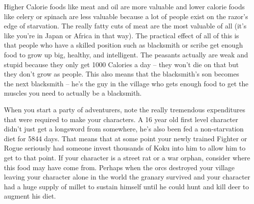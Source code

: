 Higher Calorie foods like meat and oil are more valuable and lower calorie foods like celery or spinach are less valuable because a lot of people exist on the razor's edge of starvation. The really fatty cuts of meat are the most valuable of all (it's like you're in Japan or Africa in that way). The practical effect of all of this is that people who have a skilled position such as blacksmith or scribe get enough food to grow up big, healthy, and intelligent. The peasants actually are weak and stupid because they only get 1000 Calories a day -- they won't die on that but they don't grow as people. This also means that the blacksmith's son becomes the next blacksmith -- he's the guy in the village who gets enough food to get the muscles you need to actually be a blacksmith.

When you start a party of adventurers, note the really tremendous expenditures that were required to make your characters. A 16 year old first level character didn't just get a longsword from somewhere, he's also been fed a non-starvation diet for 5844 days. That means that at some point your newly trained Fighter or Rogue seriously had someone invest thousands of Koku into him to allow him to get to that point. If your character is a street rat or a war orphan, consider where this food may have come from. Perhaps when the orcs destroyed your village leaving your character alone in the world the granary survived and your character had a huge supply of millet to sustain himself until he could hunt and kill deer to augment his diet.

